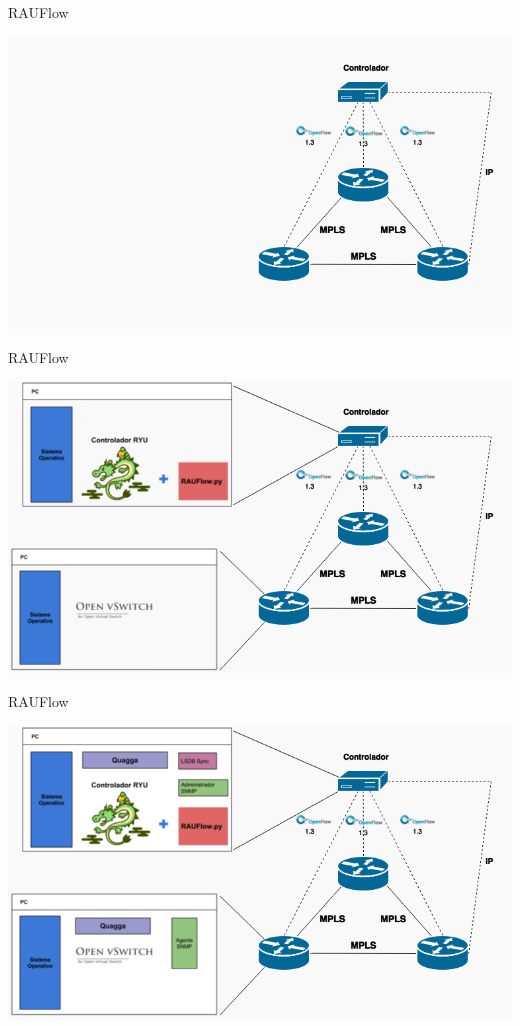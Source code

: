 \documentclass[xcolor=svgnames]{beamer}
\begin{document}
\begin{frame}{RAUFlow}
	\begin{center}
		\includegraphics[scale=0.6]{componentes_rauflow01}
	\end{center}
\end{frame}

\begin{frame}{RAUFlow}
	\begin{center}
		\includegraphics[scale=0.6]{componentes_rauflow02}
	\end{center}
\end{frame}

\begin{frame}{RAUFlow}
	\begin{center}
		\includegraphics[scale=0.6]{componentes_rauflow}
	\end{center}
\end{frame}
\end{document}
